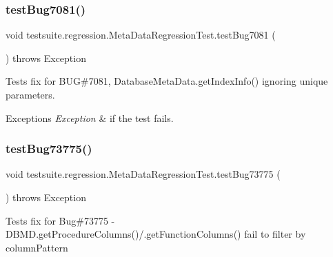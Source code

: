 \subsubsection{\texorpdfstring{test\+Bug7081()}{testBug7081()}}
{\footnotesize\ttfamily void testsuite.\+regression.\+Meta\+Data\+Regression\+Test.\+test\+Bug7081 (\begin{DoxyParamCaption}{ }\end{DoxyParamCaption}) throws Exception}

Tests fix for B\+UG\#7081, Database\+Meta\+Data.\+get\+Index\+Info() ignoring \textquotesingle{}unique\textquotesingle{} parameters.


\begin{DoxyExceptions}{Exceptions}
{\em Exception} & if the test fails. \\
\hline
\end{DoxyExceptions}
\mbox{\label{classtestsuite_1_1regression_1_1_meta_data_regression_test_ab626be438fcdf7bbb6d528f00a7dda1d}} 
\subsubsection{\texorpdfstring{test\+Bug73775()}{testBug73775()}}
{\footnotesize\ttfamily void testsuite.\+regression.\+Meta\+Data\+Regression\+Test.\+test\+Bug73775 (\begin{DoxyParamCaption}{ }\end{DoxyParamCaption}) throws Exception}

Tests fix for Bug\#73775 -\/ D\+B\+M\+D.\+get\+Procedure\+Columns()/.get\+Function\+Columns() fail to filter by column\+Pattern \mbox{\label{classtestsuite_1_1regression_1_1_meta_data_regression_test_a59b663373c79eec136ca0c2473dac25c}} 
